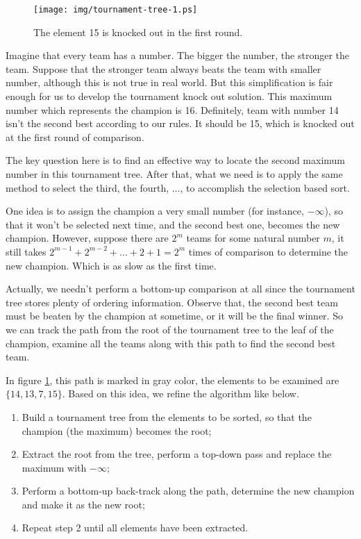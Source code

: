 \documentclass{article}
\begin{document}
\begin{figure}[htbp]
  \centering
  \texttt{[image: img/tournament-tree-1.ps]}
  \caption{The element 15 is knocked out in the first round.}
  \label{fig:tournament-tree-1}
\end{figure}

Imagine that every team has a number. The bigger the number, the stronger the team. Suppose
that the stronger team always beats the team with smaller number, although this is not true
in real world. But this simplification is fair enough for us to develop the tournament knock
out solution. This maximum number which represents the champion is 16. Definitely, team with
number 14 isn't the second best according to our rules. It should be 15, which is knocked
out at the first round of comparison.

The key question here is to find an effective way to locate the second maximum number in this
tournament tree. After that, what we need is to apply the same method to select the third,
the fourth, ..., to accomplish the selection based sort.

One idea is to assign the champion a very small number (for instance, $-\infty$),
so that it won't be selected next time, and the second best one, becomes the new champion.
However, suppose there are $2^m$ teams for some natural number $m$, it still takes
$2^{m-1} + 2^{m-2} + ... + 2 + 1 = 2^m$ times of comparison to determine the new
champion. Which is as slow as the first time.

Actually, we needn't perform a bottom-up comparison at all since the tournament tree
stores plenty of ordering information. Observe that, the second best team must
be beaten by the champion at sometime, or it will be the final winner. So we
can track the path from the root of the tournament tree to the leaf of the
champion, examine all the teams along with this path to find the second best team.

In figure \ref{fig:tournament-tree-1}, this path is marked in gray color, the elements
to be examined are $\{14, 13, 7, 15\}$. Based on this idea, we refine the algorithm
like below.

\begin{enumerate}
\item Build a tournament tree from the elements to be sorted, so that the champion (the maximum) becomes the root;
\item Extract the root from the tree, perform a top-down pass and replace the maximum with $-\infty$;
\item Perform a bottom-up back-track along the path, determine the new champion and make it as the new root;
\item Repeat step 2 until all elements have been extracted.
\end{enumerate}
\end{document}
